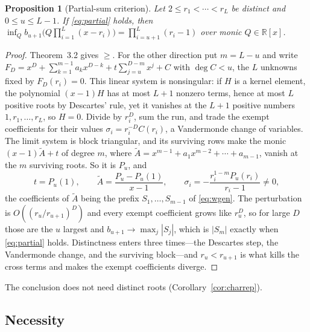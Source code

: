 \documentclass[11pt]{article}
\newtheorem{proposition}[theorem]{Proposition}
\theoremstyle{definition}
\theoremstyle{plain}
\newcommand{\R}{\mathbb R}
\begin{document}
\begin{proposition}[Partial-sum criterion]\label{prop:partial}
Let $2\le r_1<\cdots<r_L$ be distinct and $0\le u\le L-1$.  If
\eqref{eq:partial} holds, then
$\inf_Qb_{u+1}\bigl(Q\prod_{i=1}^L(x-r_i)\bigr)=\prod_{i=u+1}^L(r_i-1)$ over
monic $Q\in\R[x]$.
\end{proposition}

\begin{proof}
Theorem~3.2 gives $\ge$.  For the other direction put $m=L-u$ and write
$F_D=x^D+\sum_{k=1}^{m-1}a_kx^{D-k}+t\sum_{j=u}^{D-m}x^j+C$ with $\deg C<u$,
the $L$ unknowns fixed by $F_D(r_i)=0$.  This linear system is
nonsingular: if $H$ is a kernel element, the polynomial $(x-1)H$ has at most
$L+1$ nonzero terms, hence at most $L$ positive roots by Descartes' rule,
yet it vanishes at the $L+1$ positive numbers $1,r_1,\ldots,r_L$, so $H=0$.
Divide by $r_i^D$, sum the run, and trade the exempt coefficients for their
values $\sigma_i=r_i^{-D}C(r_i)$, a Vandermonde change of variables.  The
limit system is block triangular, and its surviving rows make the monic
$(x-1)\widetilde A+t$ of degree $m$, where
$\widetilde A=x^{m-1}+a_1x^{m-2}+\cdots+a_{m-1}$, vanish at the $m$ surviving
roots.  So it is $P_u$, and
\[
  t=P_u(1),\qquad
  \widetilde A=\frac{P_u-P_u(1)}{x-1},\qquad
  \sigma_i=-\frac{r_i^{1-m}P_u(r_i)}{r_i-1}\ne0 ,
\]
the coefficients of $\widetilde A$ being the prefix $S_1,\ldots,S_{m-1}$ of
\eqref{eq:wgen}.  The perturbation is $O((r_u/r_{u+1})^D)$ and every exempt
coefficient grows like $r_u^D$, so for large $D$ those are the $u$ largest and
$b_{u+1}\to\max_j|S_j|$, which is $|S_m|$ exactly when \eqref{eq:partial}
holds.  Distinctness enters three times---the Descartes step, the Vandermonde
change, and the surviving block---and $r_u<r_{u+1}$ is what kills the cross
terms and makes the exempt coefficients diverge.
\end{proof}

The conclusion does not need distinct roots (Corollary~\ref{cor:charrep}).

\subsection*{Necessity}
\end{document}
